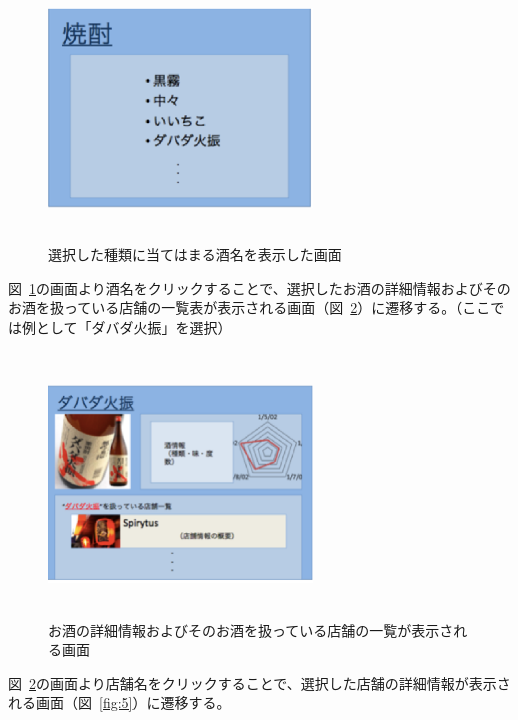 \begin {figure}[!htbp]
    \begin{center}
    \includegraphics [height=7cm, width=7cm]{3.eps}
      \caption {選択した種類に当てはまる酒名を表示した画面}
    \label {fig:3}
    \end{center}
\end {figure}
図~\ref{fig:3}の画面より酒名をクリックすることで、選択したお酒の詳細情報およびそのお酒を扱っている店舗の一覧表が表示される画面（図~\ref{fig:4}）に遷移する。（ここでは例として「ダバダ火振」を選択）
\clearpage
\begin {figure}[!htbp]
    \begin{center}
    \includegraphics [height=7cm, width=7cm]{4.eps}
    \caption {お酒の詳細情報およびそのお酒を扱っている店舗の一覧が表示される画面}
    \label {fig:4}
    \end{center}
\end {figure}



図~\ref{fig:4}の画面より店舗名をクリックすることで、選択した店舗の詳細情報が表示される画面（図~\ref{fig:5}）に遷移する。

